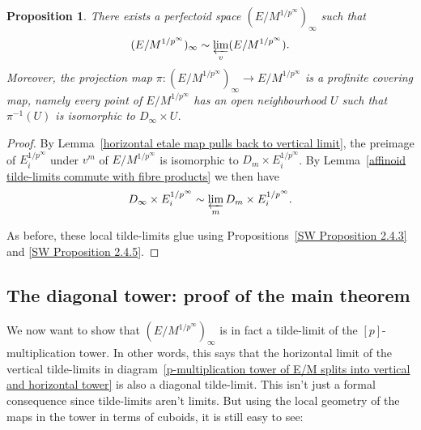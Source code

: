 \documentclass[10pt,oneside]{amsart}
\newtheorem{proposition}[theorem]{Proposition}
\theoremstyle{definition}
\begin{document}
	\begin{proposition}\label{horizontal limit of vertical limit}
	There exists a perfectoid space $(E/M^{1/p^\infty})_\infty$ such that \[(E/M^{1/p^\infty})_\infty\sim \varprojlim_{v}(E/M^{1/p^\infty}).\]
	 Moreover, the projection map $\pi:(E/M^{1/p^\infty})_\infty\rightarrow E/M^{1/p^\infty}$ is a profinite covering map, namely every point of $E/M^{1/p^\infty}$ has an open neighbourhood $U$ such that $\pi^{-1}(U)$ is isomorphic to $D_\infty \times U$.
	\end{proposition}
	\begin{proof}
	By Lemma~\ref{horizontal etale map pulls back to vertical limit}, the preimage of $E_i^{1/p^\infty}$ under $v^m$ of $E/M^{1/p^\infty}$ is isomorphic to $D_m\times E_i^{1/p^\infty}$. By Lemma~\ref{affinoid tilde-limits commute with fibre products} we then have
	\[D_\infty \times E_i^{1/p^\infty}\sim \varprojlim_m D_m\times E_i^{1/p^\infty}.\]
	
	As before, these local tilde-limits glue using Propositions~\ref{SW Proposition 2.4.3} and \ref{SW Proposition 2.4.5}.
	\end{proof}
	
	\subsection{The diagonal tower: proof of the main theorem}
	We now want to show that $(E/M^{1/p^\infty})_\infty$ is in fact a tilde-limit of the $[p]$-multiplication tower. In other words, this says that the horizontal limit of the vertical tilde-limits in diagram~\ref{p-multiplication tower of E/M splits into vertical and horizontal tower} is also a diagonal tilde-limit.
	This isn't just a formal consequence since tilde-limits aren't limits. But using the local geometry of the maps in the tower in terms of cuboids, it is still easy to see:
	
\end{document}
